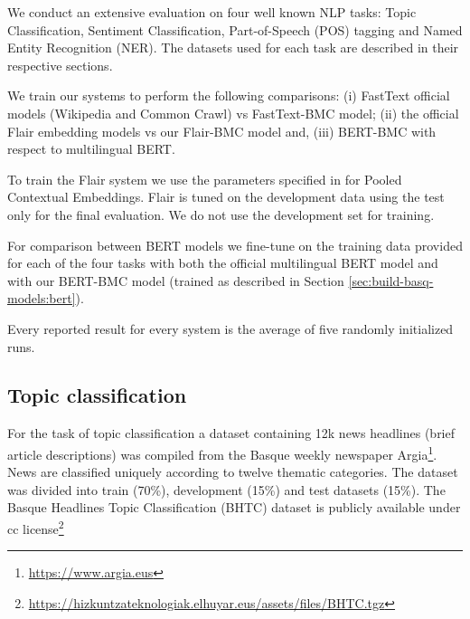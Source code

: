 \documentclass[10pt, a4paper]{article}
\begin{document}






We conduct an extensive evaluation on four well known NLP tasks: Topic Classification, Sentiment Classification, Part-of-Speech (POS) tagging and Named Entity Recognition (NER). The datasets used for each task are described in their respective sections.

We train our systems to perform the following comparisons: (i) FastText official models (Wikipedia and Common Crawl) vs FastText-BMC model; (ii) the official Flair embedding models vs our Flair-BMC model and, (iii) BERT-BMC with respect to multilingual BERT.

To train the Flair system we use the parameters specified in \cite{akbik2019naacl} for Pooled Contextual Embeddings. Flair is tuned on the development data using the test only for the final evaluation. We do not use the development set for training.

For comparison between BERT models we fine-tune on the training data provided for each of the four tasks with both the official multilingual BERT \cite{devlin2019bert} model and with our BERT-BMC model (trained as described in Section \ref{sec:build-basq-models:bert}).

Every reported result for every system is the average of five randomly initialized runs.

\subsection{Topic classification}\label{sec:topic}

For the task of topic classification a dataset containing 12k news headlines (brief article descriptions) was compiled from the Basque weekly newspaper Argia\footnote{\url{https://www.argia.eus}}. News are classified uniquely according to twelve thematic categories. The dataset was divided into train (70\%), development (15\%) and test datasets (15\%). The Basque Headlines Topic Classification (BHTC) dataset is publicly available under cc license\footnote{\url{https://hizkuntzateknologiak.elhuyar.eus/assets/files/BHTC.tgz}} 
\end{document}
